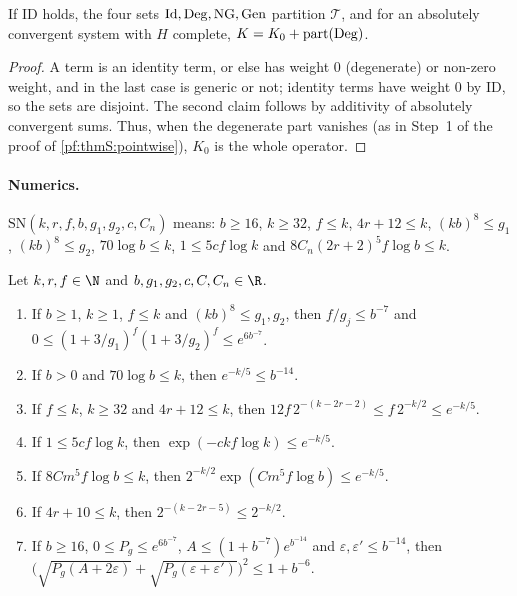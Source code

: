 \begin{lemma}\label{pf:thmS:fourparts}
If $\mathrm{ID}$ holds, the four sets $\mathrm{Id},\mathrm{Deg},\mathrm{NG},\mathrm{Gen}$ partition $\mathcal T$, and for an
absolutely convergent system with $H$ complete, $K=K_0+\operatorname{part}(\mathrm{Deg})$.
\end{lemma}

\begin{proof}
A term is an identity term, or else has weight $0$ (degenerate) or non-zero weight, and in the last case is generic or
not; identity terms have weight $0$ by $\mathrm{ID}$, so the sets are disjoint. The second claim follows by additivity of
absolutely convergent sums. Thus, when the degenerate part vanishes (as in Step~1 of the proof of
\cref{pf:thmS:pointwise}), $K_0$ is the whole operator.
\end{proof}

\paragraph{Numerics.}
\begin{definition}\label{pf:thmS:sizenumbers}
$\mathrm{SN}(k,r,f,b,g_1,g_2,c,C_n)$ means: $b\ge16$, $k\ge32$, $f\le k$, $4r+12\le k$, $(kb)^8\le g_1$,
$(kb)^8\le g_2$, $70\log b\le k$, $1\le5cf\log k$ and $8C_n(2r+2)^5f\log b\le k$.
\end{definition}

\begin{lemma}\label{pf:thmS:num}
Let $k,r,f\in\N$ and $b,g_1,g_2,c,C,C_n\in\R$.
\begin{enumerate}
\item If $b\ge1$, $k\ge1$, $f\le k$ and $(kb)^8\le g_1,g_2$, then $f/g_j\le b^{-7}$ and
$0\le(1+3/g_1)^f(1+3/g_2)^f\le e^{6b^{-7}}$.
\item If $b>0$ and $70\log b\le k$, then $e^{-k/5}\le b^{-14}$.
\item If $f\le k$, $k\ge32$ and $4r+12\le k$, then $12f\,2^{-(k-2r-2)}\le f\,2^{-k/2}\le e^{-k/5}$.
\item If $1\le5cf\log k$, then $\exp(-ckf\log k)\le e^{-k/5}$.
\item If $8Cm^5f\log b\le k$, then $2^{-k/2}\exp(Cm^5f\log b)\le e^{-k/5}$.
\item If $4r+10\le k$, then $2^{-(k-2r-5)}\le2^{-k/2}$.
\item If $b\ge16$, $0\le P_g\le e^{6b^{-7}}$, $A\le(1+b^{-7})e^{b^{-14}}$ and $\varepsilon,\varepsilon'\le b^{-14}$, then
$\bigl(\sqrt{P_g(A+2\varepsilon)}+\sqrt{P_g(\varepsilon+\varepsilon')}\bigr)^2\le1+b^{-6}$.
\end{enumerate}
\end{lemma}

